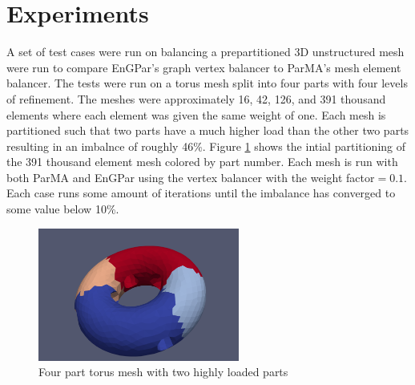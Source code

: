 \documentclass[a4paper]{article}
\begin{document}
\section{Experiments}
A set of test cases were run on balancing a prepartitioned 3D unstructured mesh were run to compare EnGPar's graph vertex balancer to ParMA's mesh element balancer. The tests were run on a torus mesh split into four parts with four levels of refinement. The meshes were approximately 16, 42, 126, and 391 thousand elements where each element was given the same weight of one. Each mesh is partitioned such that two parts have a much higher load than the other two parts resulting in an imbalnce of roughly 46\%. Figure \ref{fig:torus} shows the intial partitioning of the 391 thousand element mesh colored by part number. Each mesh is run with both ParMA and EnGPar using the vertex balancer with the weight factor$=0.1$. Each case runs some amount of iterations until the imbalance has converged to some value below 10\%.


\begin{figure}[!ht]
  \centering
  \includegraphics[width=250px]{torus.png}
  \caption{Four part torus mesh with two highly loaded parts}
  \label{fig:torus}
\end{figure}
\end{document}
